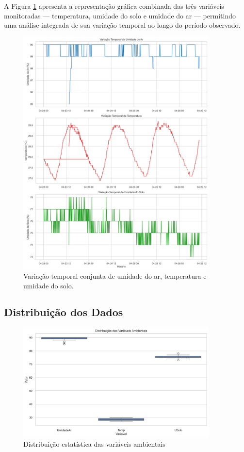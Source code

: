 \documentclass[12pt, a4paper]{article}
\begin{document}
A Figura \ref{fig:temporal_combinado} apresenta a representação gráfica combinada das três variáveis monitoradas — temperatura, umidade do solo e umidade do ar — permitindo uma análise integrada de sua variação temporal ao longo do período observado.

\begin{figure}[H]
\centering
\includegraphics[width=0.9\textwidth]{graficos/temporal_combinado.png}
\caption{Variação temporal conjunta de umidade do ar, temperatura e umidade do solo.}
\label{fig:temporal_combinado}
\end{figure}


\subsection{Distribuição dos Dados}
\begin{figure}[H]
\centering
\includegraphics[width=0.9\textwidth]{graficos/boxplot_variaveis.png}
\caption{Distribuição estatística das variáveis ambientais}
\label{fig:boxplot}
\end{figure}
\end{document}
